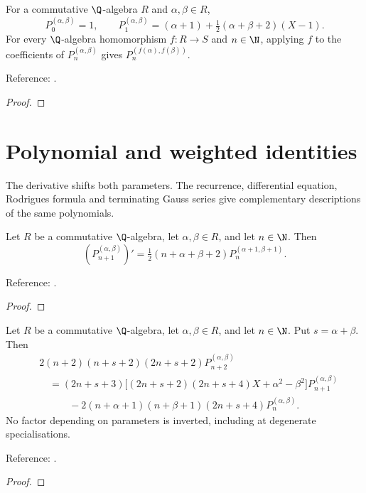 \begin{supporting}

\begin{theorem}
\label{thm:jacobi-low-degree}
\leanok
For a commutative $\Q$-algebra $R$ and $\alpha,\beta\in R$,
\[P_0^{(\alpha,\beta)}=1,\qquad
P_1^{(\alpha,\beta)}=(\alpha+1)+\tfrac12(\alpha+\beta+2)(X-1).\]
For every $\Q$-algebra homomorphism $f:R\to S$ and $n\in\N$, applying $f$ to the
coefficients of $P_n^{(\alpha,\beta)}$ gives $P_n^{(f(\alpha),f(\beta))}$.

Reference: \cite[18.5.7]{dlmf}.
\end{theorem}
\begin{proof}
\leanok
\end{proof}

\end{supporting}

\section{Polynomial and weighted identities}\label{sec:textbook-jacobi-identities}

The derivative shifts both parameters. The recurrence, differential equation, Rodrigues formula and terminating Gauss series give complementary descriptions of the same polynomials.

\begin{theorem}
\label{thm:jacobi-derivative}
\leanok
Let $R$ be a commutative $\Q$-algebra, let $\alpha,\beta\in R$, and let $n\in\N$. Then
\[(P_{n+1}^{(\alpha,\beta)})'=\tfrac12(n+\alpha+\beta+2)
 P_n^{(\alpha+1,\beta+1)}.\]

Reference: \cite[18.9.15]{dlmf}.
\end{theorem}
\begin{proof}
\leanok
\end{proof}

\begin{theorem}
\label{thm:jacobi-recurrence}
\leanok
Let $R$ be a commutative $\Q$-algebra, let $\alpha,\beta\in R$, and let $n\in\N$. Put $s=\alpha+\beta$. Then
\begin{align*}
&2(n+2)(n+s+2)(2n+s+2)P_{n+2}^{(\alpha,\beta)}\\
&\quad=(2n+s+3)\bigl[(2n+s+2)(2n+s+4)X+\alpha^2-\beta^2\bigr]
 P_{n+1}^{(\alpha,\beta)}\\
&\qquad\quad-2(n+\alpha+1)(n+\beta+1)(2n+s+4)P_n^{(\alpha,\beta)}.
\end{align*}
No factor depending on parameters is inverted, including at degenerate specialisations.

Reference: \cite[18.9.1--18.9.2]{dlmf}.
\end{theorem}
\begin{proof}
\leanok
\end{proof}

